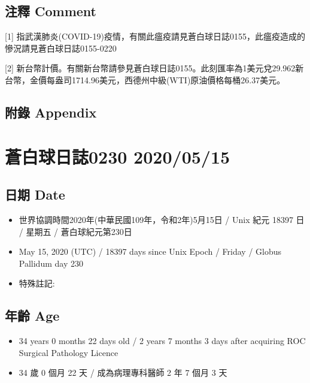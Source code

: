 \documentclass[a5paper, 11pt
]{book}
\providecommand{\tightlist}{%
  \setlength{\itemsep}{0pt}\setlength{\parskip}{0pt}}
\begin{document}
\hypertarget{ux6ce8ux91cb-comment-74}{%
\subsection{注釋 Comment}\label{ux6ce8ux91cb-comment-74}}

{[}1{]}
指武漢肺炎(COVID-19)疫情，有關此瘟疫請見蒼白球日誌0155，此瘟疫造成的慘況請見蒼白球日誌0155-0220

{[}2{]}
新台幣計價。有關新台幣請參見蒼白球日誌0155。此刻匯率為1美元兌29.962新台幣，金價每盎司1714.96美元，西德州中級(WTI)原油價格每桶26.37美元。

\hypertarget{ux9644ux9304-appendix-74}{%
\subsection{附錄 Appendix}\label{ux9644ux9304-appendix-74}}

\hypertarget{ux84bcux767dux7403ux65e5ux8a8c0230-20200515}{%
\section{蒼白球日誌0230
2020/05/15}\label{ux84bcux767dux7403ux65e5ux8a8c0230-20200515}}

\hypertarget{ux65e5ux671f-date-75}{%
\subsection{日期 Date}\label{ux65e5ux671f-date-75}}

\begin{itemize}
\tightlist
\item
  世界協調時間2020年(中華民國109年，令和2年)5月15日 / Unix 紀元 18397 日
  / 星期五 / 蒼白球紀元第230日
\item
  May 15, 2020 (UTC) / 18397 days since Unix Epoch / Friday / Globus
  Pallidum day 230
\item
  特殊註記:
\end{itemize}

\hypertarget{ux5e74ux9f61-age-75}{%
\subsection{年齡 Age}\label{ux5e74ux9f61-age-75}}

\begin{itemize}
\tightlist
\item
  34 years 0 months 22 days old / 2 years 7 months 3 days after
  acquiring ROC Surgical Pathology Licence
\item
  34 歲 0 個月 22 天 / 成為病理專科醫師 2 年 7 個月 3 天
\end{itemize}
\end{document}
